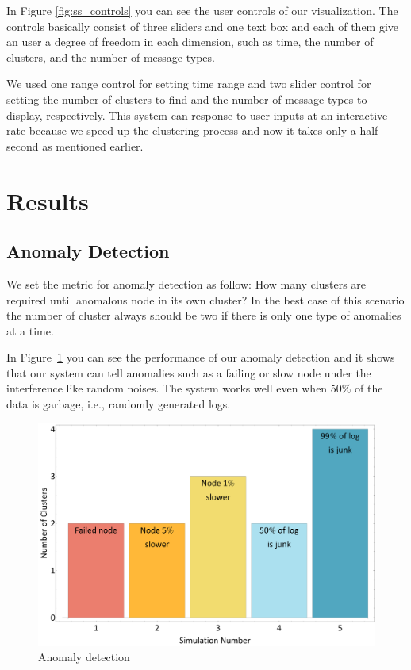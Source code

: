 \documentclass[conference]{acmsiggraph}
\begin{document}
In Figure \ref{fig:ss_controls} you can see the user controls of our visualization. The controls
basically consist of three sliders and one text box and each of them give an user a degree of
freedom in each dimension, such as time, the number of clusters, and the number of message types.

We used one range control for setting time range and two slider control for setting the number of
clusters to find and the number of message types to display, respectively. This system can response
to user inputs at an interactive rate because we speed up the clustering process and now it takes
only a half second as mentioned earlier.


\section{Results}

\subsection{Anomaly Detection}
We set the metric for anomaly detection as follow: How many clusters are required until anomalous
node in its own cluster? In the best case of this scenario the number of cluster always should be
two if there is only one type of anomalies at a time.

In Figure~\ref{fig:anomaly} you can see the performance of our anomaly detection and it shows that
our system can tell anomalies such as a failing or slow node under the interference like random
noises. The system works well even when 50\% of the data is garbage, i.e., randomly generated logs.

\begin{figure}[p]
    \centering
    \includegraphics[width=1.0\columnwidth]{images/anomaly.pdf}
    \caption{Anomaly detection}
    \label{fig:anomaly}
\end{figure}
\end{document}
